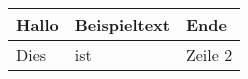 \begin{tabularx}{\textwidth}{X|X|X}
  Hallo & Beispieltext & Ende \\
  \hline
  Dies  & ist      & Zeile 2 \\
\end{tabularx}
